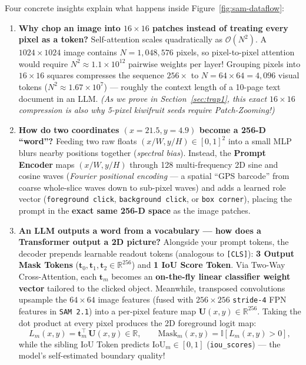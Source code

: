 \documentclass[10.5pt,a4paper]{article}
\begin{document}
Four concrete insights explain what happens inside Figure~\ref{fig:sam-dataflow}:
\begin{enumerate}
    \item \textbf{Why chop an image into $16 \times 16$ patches instead of treating every pixel as a token?} Self-attention scales quadratically as $\mathcal{O}(N^2)$. A $1024 \times 1024$ image contains $N = 1{,}048{,}576$ pixels, so pixel-to-pixel attention would require $N^2 \approx 1.1 \times 10^{12}$ pairwise weights per layer! Grouping pixels into $16 \times 16$ squares compresses the sequence $256\times$ to $N = 64 \times 64 = 4{,}096$ visual tokens ($N^2 \approx 1.67 \times 10^7$) --- roughly the context length of a 10-page text document in an LLM. \emph{(As we prove in Section~\ref{sec:trap1}, this exact $16 \times 16$ compression is also why 5-pixel kiwifruit seeds require Patch-Zooming!)}
    \item \textbf{How do two coordinates $(x = 21.5, y = 4.9)$ become a 256-D ``word''?} Feeding two raw floats $(x/W, y/H) \in [0, 1]^2$ into a small MLP blurs nearby positions together (\emph{spectral bias}). Instead, the \textbf{Prompt Encoder} maps $(x/W, y/H)$ through 128 multi-frequency 2D sine and cosine waves (\emph{Fourier positional encoding} --- a spatial ``GPS barcode'' from coarse whole-slice waves down to sub-pixel waves) and adds a learned role vector (\texttt{foreground click}, \texttt{background click}, or \texttt{box corner}), placing the prompt in the \textbf{exact same 256-D space} as the image patches.
    \item \textbf{An LLM outputs a word from a vocabulary --- how does a Transformer output a 2D picture?} Alongside your prompt tokens, the decoder prepends learnable readout tokens (analogous to \texttt{[CLS]}): \textbf{3 Output Mask Tokens} ($\mathbf{t}_0, \mathbf{t}_1, \mathbf{t}_2 \in \mathbb{R}^{256}$) and \textbf{1 IoU Score Token}. Via Two-Way Cross-Attention, each $\mathbf{t}_m$ becomes an \textbf{on-the-fly linear classifier weight vector} tailored to the clicked object. Meanwhile, transposed convolutions upsample the $64 \times 64$ image features (fused with $256 \times 256$ \texttt{stride-4} FPN features in \texttt{SAM 2.1}) into a per-pixel feature map $\mathbf{U}(x, y) \in \mathbb{R}^{256}$. Taking the dot product at every pixel produces the 2D foreground logit map:
    \[
        L_m(x, y) = \mathbf{t}_m^\top \, \mathbf{U}(x, y) \in \mathbb{R}, \qquad \text{Mask}_m(x, y) = \mathbb{I}\!\left[L_m(x, y) > 0\right],
    \]
    while the sibling IoU Token predicts $\widehat{\text{IoU}}_m \in [0, 1]$ (\texttt{iou\_scores}) --- the model's self-estimated boundary quality!

\end{enumerate}
\end{document}
